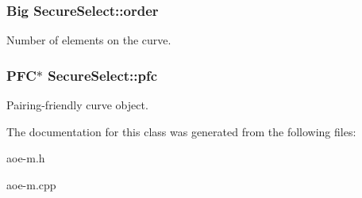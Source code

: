 \subsubsection[{\texorpdfstring{order}{order}}]{\setlength{\rightskip}{0pt plus 5cm}Big Secure\+Select\+::order}\hypertarget{classSecureSelect_ac97b5a9177b47f64f49891feb67b69b2}{}\label{classSecureSelect_ac97b5a9177b47f64f49891feb67b69b2}
Number of elements on the curve. 
\subsubsection[{\texorpdfstring{pfc}{pfc}}]{\setlength{\rightskip}{0pt plus 5cm}P\+FC$\ast$ Secure\+Select\+::pfc}\hypertarget{classSecureSelect_acd8fd34bdde543ca9711ac5e266a094d}{}\label{classSecureSelect_acd8fd34bdde543ca9711ac5e266a094d}
Pairing-\/friendly curve object. 

The documentation for this class was generated from the following files\+:\begin{DoxyCompactItemize}
\item 
aoe-\/m.\+h\item 
aoe-\/m.\+cpp\end{DoxyCompactItemize}

